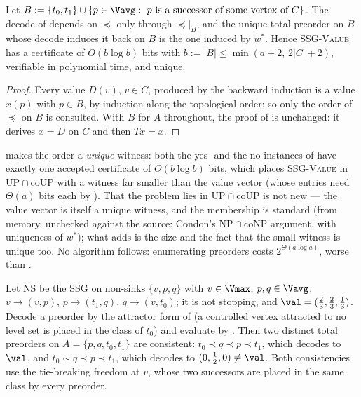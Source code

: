 \begin{corollary}\label{ol:read}
Let $B:=\{t_0,t_1\}\cup\{p\in\Vavg:\ p\ \text{is a successor of some vertex
of}\ C\}$. The decode of  depends on $\preceq$ only
through $\preceq|_B$, and the unique total preorder on $B$ whose decode
induces it back on $B$ is the one induced by $w^\ast$. Hence
\textsc{SSG-Value} has a certificate of $O(b\log b)$ bits with
$b:=|B|\le\min(a+2,\,2|C|+2)$, verifiable in polynomial time, and unique.
\end{corollary}

\begin{proof}
Every value $D(v)$, $v\in C$, produced by the backward induction is a value
$x(p)$ with $p\in B$, by induction along the topological order; so only the
order of $\preceq$ on $B$ is consulted. With $B$ for $A$ throughout, the
proof of  is unchanged: it derives $x=D$ on $C$ and then
$Tx=x$.
\end{proof}

\begin{remark}\label{ol:rem-up}
 makes the order a \emph{unique} witness: both the yes- and
the no-instances of  have exactly one accepted certificate
of $O(b\log b)$ bits, which places \textsc{SSG-Value} in
$\mathrm{UP}\cap\mathrm{coUP}$ with a witness far smaller than the value
vector (whose entries need $\Theta(a)$ bits each by
). That the problem lies in
$\mathrm{UP}\cap\mathrm{coUP}$ is not new --- the value vector is itself a
unique witness, and the membership is standard (from memory, unchecked
against the source: Condon's $\mathrm{NP}\cap\mathrm{coNP}$ argument, with
uniqueness of $w^\ast$); what  adds is the size and the
fact that the small witness is unique too. No algorithm follows:
enumerating preorders costs $2^{\Theta(a\log a)}$, worse than
.
\end{remark}

\begin{proposition}\label{ol:nonstopping}
Let $\mathrm{NS}$ be the SSG on non-sinks $\{v,p,q\}$ with $v\in\Vmax$,
$p,q\in\Vavg$, $v\to(v,p)$, $p\to(t_1,q)$, $q\to(v,t_0)$; it is not
stopping, and $\val=(\tfrac23,\tfrac23,\tfrac13)$. Decode a preorder by the
attractor form of  (a controlled vertex attracted
to no level set is placed in the class of $t_0$) and evaluate by
. Then two distinct total preorders on
$A=\{p,q,t_0,t_1\}$ are consistent:
$t_0\prec q\prec p\prec t_1$, which decodes to $\val$, and
$t_0\sim q\prec p\prec t_1$, which decodes to
$(0,\tfrac12,0)\ne\val$. Both consistencies use the tie-breaking freedom at
$v$, whose two successors are placed in the same class by every preorder.
\end{proposition}

